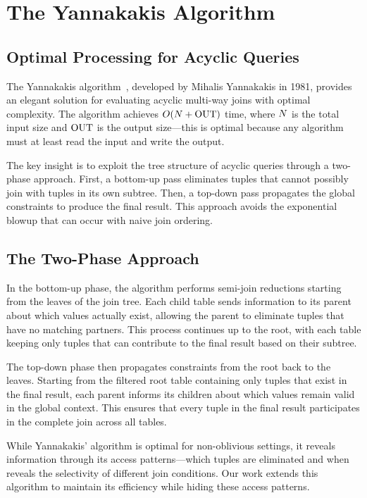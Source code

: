 \section{The Yannakakis Algorithm}

\subsection{Optimal Processing for Acyclic Queries}

The Yannakakis algorithm~\cite{yannakakis1981}, developed by Mihalis Yannakakis in 1981, provides an elegant solution for evaluating acyclic multi-way joins with optimal complexity. The algorithm achieves $O(N + \text{OUT})$ time, where $N$ is the total input size and $\text{OUT}$ is the output size---this is optimal because any algorithm must at least read the input and write the output.

The key insight is to exploit the tree structure of acyclic queries through a two-phase approach. First, a bottom-up pass eliminates tuples that cannot possibly join with tuples in its own subtree. Then, a top-down pass propagates the global constraints to produce the final result. This approach avoids the exponential blowup that can occur with naive join ordering.

\subsection{The Two-Phase Approach}

In the bottom-up phase, the algorithm performs semi-join reductions starting from the leaves of the join tree. Each child table sends information to its parent about which values actually exist, allowing the parent to eliminate tuples that have no matching partners. This process continues up to the root, with each table keeping only tuples that can contribute to the final result based on their subtree.

The top-down phase then propagates constraints from the root back to the leaves. Starting from the filtered root table containing only tuples that exist in the final result, each parent informs its children about which values remain valid in the global context. This ensures that every tuple in the final result participates in the complete join across all tables.

While Yannakakis' algorithm is optimal for non-oblivious settings, it reveals information through its access patterns---which tuples are eliminated and when reveals the selectivity of different join conditions. Our work extends this algorithm to maintain its efficiency while hiding these access patterns.

